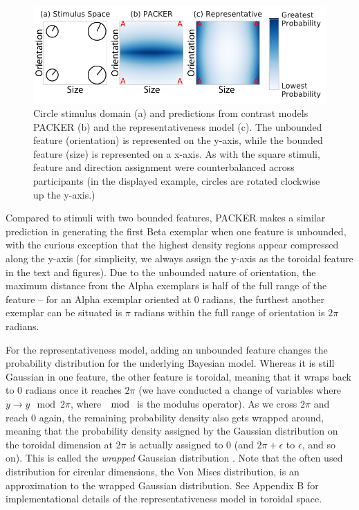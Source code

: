 \documentclass[12pt]{article}
\begin{document}
\begin{flushleft}
\begin{figure}[p]
    \begin{center} 
      \includegraphics[width=.8\textwidth]{figs/e3-circles.pdf}
      \caption{Circle stimulus domain (a) and predictions from contrast models
        PACKER (b) and the representativeness model (c). The unbounded feature
        (orientation) is represented on the y-axis, while the bounded feature
        (size) is represented on a x-axis. As with the square stimuli, feature
        and direction assignment were counterbalanced across participants (in
        the displayed example, circles are rotated clockwise up the y-axis.) }
      \label{fig:e3-circles}
    \end{center}
\end{figure}


Compared to stimuli with two bounded features, PACKER makes a similar prediction in generating the first Beta exemplar when one feature is unbounded, with the curious exception that the highest density regions appear compressed along the y-axis (for simplicity, we always assign the y-axis as the toroidal feature in the text and figures). Due to the unbounded nature of orientation, the maximum distance from
the Alpha exemplars is half of the full range of the feature -- for an Alpha
exemplar oriented at 0 radians, the furthest another exemplar can be situated is $\pi$ radians within the full range of orientation is $2\pi$ radians. 

For the representativeness model, adding an unbounded feature changes the
probability distribution for the underlying Bayesian model. Whereas it is still
Gaussian in one feature, the other feature is toroidal, meaning that it wraps
back to $0$ radians once it reaches $2\pi$ (we have conducted a change of
variables where $y \rightarrow y \mod 2\pi $, where $\mod$ is the modulus
operator). As we cross $2\pi$ and reach $0$ again, the remaining probability
density also gets wrapped around, meaning that the probability density assigned
by the Gaussian distribution on the toroidal dimension at $2\pi$ is actually
assigned to $0$ (and $2\pi + \epsilon$ to $\epsilon$, and so on). This is called the
{\em wrapped} Gaussian distribution \citep{mardia1972}. Note that the often used
distribution for circular dimensions, the Von Mises distribution, is an
approximation to the wrapped Gaussian distribution. See Appendix B for
implementational details of the representativeness model in toroidal space.


\end{flushleft}
\end{document}
